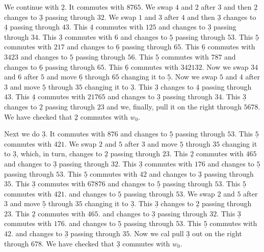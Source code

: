 \documentclass[a4paper]{amsart}
\begin{document}
We continue with $\underline{2}$. It commutes with $8765$.
We swap $4$ and $2$ after $3$ and then $\underline{2}$
changes to $\underline{3}$ passing through $32$.
We swap $1$ and $3$ after $4$ and then $\underline{3}$
changes to $\underline{4}$ passing through $43$.
This $\underline{4}$ commutes with $125$ and changes
to  $\underline{3}$ passing through $34$.
This $\underline{3}$ commutes with $6$
and changes to  $\underline{5}$ passing through $53$.
This $\underline{5}$ commutes with $217$
and changes to  $\underline{6}$ passing through $65$.
This $\underline{6}$ commutes with $3423$
and changes to  $\underline{5}$ passing through $56$.
This $\underline{5}$ commutes with $787$
and changes to  $\underline{6}$ passing through $65$.
This $\underline{6}$ commutes with $342132$.
Now we swap $34$ and $6$ after $5$ and move
$\underline{6}$ through $65$ changing it to $\underline{5}$.
Now we swap $5$ and $4$ after $3$ and move
$\underline{5}$ through $35$ changing it to $\underline{3}$.
This $\underline{3}$ changes to  $\underline{4}$ 
passing through $43$.
This $\underline{4}$ commutes with $21765$
and changes to  $\underline{3}$ passing through $34$.
This $\underline{3}$ changes to  $\underline{2}$ 
passing through $23$ and we, finally, pull
it on the right through $5678$. We have checked that 
$\underline{2}$ commutes with $w_0$.

Next we do $\underline{3}$. It commutes with $876$
and changes to  $\underline{5}$  passing through $53$.
This $\underline{5}$ commutes with $421$.
We swap $2$ and $5$ after $3$ and move 
$\underline{5}$  through $35$ changing it to  $\underline{3}$,
which, in turn, changes to $\underline{2}$ 
passing through $23$.
This $\underline{2}$ commutes with $465$
and changes to  $\underline{3}$ passing through $32$.
This $\underline{3}$ commutes with $176$
and changes to  $\underline{5}$ passing through $53$.
This $\underline{5}$ commutes with $42$
and changes to  $\underline{3}$ passing through $35$.
This $\underline{3}$ commutes with $67876$
and changes to  $\underline{5}$ passing through $53$.
This $\underline{5}$ commutes with $421$.
and changes to  $\underline{5}$ passing through $53$.
We swap $2$ and $5$ after $3$ and move 
$\underline{5}$  through $35$ changing it to  $\underline{3}$.
This $\underline{3}$ changes to  $\underline{2}$ passing through $23$.
This $\underline{2}$ commutes with $465$.
and changes to  $\underline{3}$ passing through $32$.
This $\underline{3}$ commutes with $176$.
and changes to  $\underline{5}$ passing through $53$.
This $\underline{5}$ commutes with $42$.
and changes to  $\underline{3}$ passing through $35$.
Now we cal pull $\underline{3}$ out on the right
through $678$. We have checked that 
$\underline{3}$ commutes with $w_0$.
\end{document}
